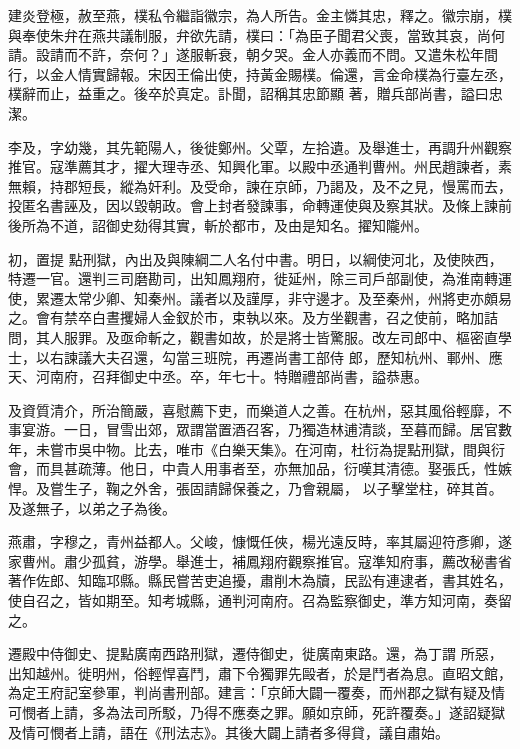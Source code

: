 \begin{pinyinscope}
 建炎登極，赦至燕，樸私令繼詣徽宗，為人所告。金主憐其忠，釋之。徽宗崩，樸與奉使朱弁在燕共議制服，弁欲先請，樸曰：「為臣子聞君父喪，當致其哀，尚何請。設請而不許，奈何？」遂服斬衰，朝夕哭。金人亦義而不問。又遣朱松年間行，以金人情實歸報。宋因王倫出使，持黃金賜樸。倫還，言金命樸為行臺左丞，樸辭而止，益重之。後卒於真定。訃聞，詔稱其忠節顯
 著，贈兵部尚書，謚曰忠潔。



 李及，字幼幾，其先範陽人，後徙鄭州。父覃，左拾遺。及舉進士，再調升州觀察推官。寇準薦其才，擢大理寺丞、知興化軍。以殿中丞通判曹州。州民趙諫者，素無賴，持郡短長，縱為奸利。及受命，諫在京師，乃謁及，及不之見，慢罵而去，投匿名書誣及，因以毀朝政。會上封者發諫事，命轉運使與及察其狀。及條上諫前後所為不道，詔御史劾得其實，斬於都市，及由是知名。擢知隴州。



 初，置提
 點刑獄，內出及與陳綱二人名付中書。明日，以綱使河北，及使陜西，特遷一官。還判三司磨勘司，出知鳳翔府，徙延州，除三司戶部副使，為淮南轉運使，累遷太常少卿、知秦州。議者以及謹厚，非守邊才。及至秦州，州將吏亦頗易之。會有禁卒白晝攫婦人金釵於市，束執以來。及方坐觀書，召之使前，略加詰問，其人服罪。及亟命斬之，觀書如故，於是將士皆驚服。改左司郎中、樞密直學士，以右諫議大夫召還，勾當三班院，再遷尚書工部侍
 郎，歷知杭州、鄆州、應天、河南府，召拜御史中丞。卒，年七十。特贈禮部尚書，謚恭惠。



 及資質清介，所治簡嚴，喜慰薦下吏，而樂道人之善。在杭州，惡其風俗輕靡，不事宴游。一日，冒雪出郊，眾謂當置酒召客，乃獨造林逋清談，至暮而歸。居官數年，未嘗市吳中物。比去，唯市《白樂天集》。在河南，杜衍為提點刑獄，間與衍會，而具甚疏薄。他日，中貴人用事者至，亦無加品，衍嘆其清德。娶張氏，性嫉悍。及嘗生子，鞠之外舍，張固請歸保養之，乃會親屬，
 以子擊堂柱，碎其首。及遂無子，以弟之子為後。



 燕肅，字穆之，青州益都人。父峻，慷慨任俠，楊光遠反時，率其屬迎符彥卿，遂家曹州。肅少孤貧，游學。舉進士，補鳳翔府觀察推官。寇準知府事，薦改秘書省著作佐郎、知臨邛縣。縣民嘗苦吏追擾，肅削木為牘，民訟有連逮者，書其姓名，使自召之，皆如期至。知考城縣，通判河南府。召為監察御史，準方知河南，奏留之。



 遷殿中侍御史、提點廣南西路刑獄，遷侍御史，徙廣南東路。還，為丁謂
 所惡，出知越州。徙明州，俗輕悍喜鬥，肅下令獨罪先毆者，於是鬥者為息。直昭文館，為定王府記室參軍，判尚書刑部。建言：「京師大闢一覆奏，而州郡之獄有疑及情可憫者上請，多為法司所駁，乃得不應奏之罪。願如京師，死許覆奏。」遂詔疑獄及情可憫者上請，語在《刑法志》。其後大闢上請者多得貸，議自肅始。




\end{pinyinscope}
